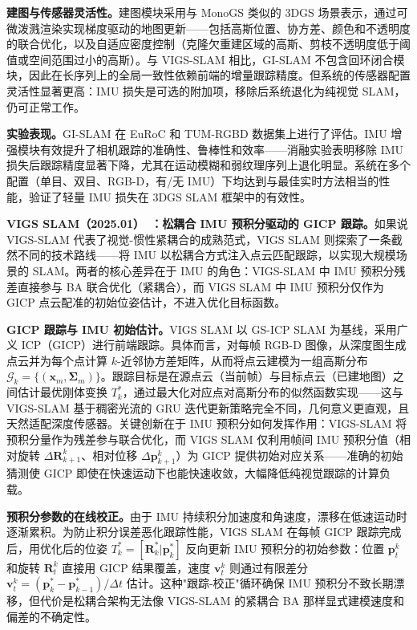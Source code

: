 \textbf{建图与传感器灵活性。}建图模块采用与 MonoGS 类似的 3DGS 场景表示，通过可微泼溅渲染实现梯度驱动的地图更新——包括高斯位置、协方差、颜色和不透明度的联合优化，以及自适应密度控制（克隆欠重建区域的高斯、剪枝不透明度低于阈值或空间范围过小的高斯）。与 VIGS-SLAM 相比，GI-SLAM 不包含回环闭合模块，因此在长序列上的全局一致性依赖前端的增量跟踪精度。但系统的传感器配置灵活性显著更高：IMU 损失是可选的附加项，移除后系统退化为纯视觉 SLAM，仍可正常工作。

\textbf{实验表现。}GI-SLAM 在 EuRoC 和 TUM-RGBD 数据集上进行了评估。IMU 增强模块有效提升了相机跟踪的准确性、鲁棒性和效率——消融实验表明移除 IMU 损失后跟踪精度显著下降，尤其在运动模糊和弱纹理序列上退化明显。系统在多个配置（单目、双目、RGB-D，有/无 IMU）下均达到与最佳实时方法相当的性能，验证了轻量 IMU 损失在 3DGS SLAM 框架中的有效性。

\textbf{VIGS SLAM（2025.01）~\cite{2501_13402}：松耦合 IMU 预积分驱动的 GICP 跟踪。}如果说 VIGS-SLAM 代表了视觉-惯性紧耦合的成熟范式，VIGS SLAM 则探索了一条截然不同的技术路线——将 IMU 以松耦合方式注入点云匹配跟踪，以实现大规模场景的 SLAM。两者的核心差异在于 IMU 的角色：VIGS-SLAM 中 IMU 预积分残差直接参与 BA 联合优化（紧耦合），而 VIGS SLAM 中 IMU 预积分仅作为 GICP 点云配准的初始位姿估计，不进入优化目标函数。

\textbf{GICP 跟踪与 IMU 初始估计。}VIGS SLAM 以 GS-ICP SLAM 为基线，采用广义 ICP（GICP）进行前端跟踪。具体而言，对每帧 RGB-D 图像，从深度图生成点云并为每个点计算 $k$-近邻协方差矩阵，从而将点云建模为一组高斯分布 $\mathcal{G}_k = \{(\mathbf{x}_m, \boldsymbol{\Sigma}_m)\}$。跟踪目标是在源点云（当前帧）与目标点云（已建地图）之间估计最优刚体变换 $T_k^*$，通过最大化对应点对高斯分布的似然函数实现——这与 VIGS-SLAM 基于稠密光流的 GRU 迭代更新策略完全不同，几何意义更直观，且天然适配深度传感器。关键创新在于 IMU 预积分如何发挥作用：VIGS-SLAM 将预积分量作为残差参与联合优化，而 VIGS SLAM 仅利用帧间 IMU 预积分值（相对旋转 $\Delta\mathbf{R}^k_{k+1}$、相对位移 $\Delta\mathbf{p}^k_{k+1}$）为 GICP 提供初始对应关系——准确的初始猜测使 GICP 即使在快速运动下也能快速收敛，大幅降低纯视觉跟踪的计算负载。

\textbf{预积分参数的在线校正。}由于 IMU 持续积分加速度和角速度，漂移在低速运动时逐渐累积。为防止积分误差恶化跟踪性能，VIGS SLAM 在每帧 GICP 跟踪完成后，用优化后的位姿 $T_k^* = [\mathbf{R}_k^*|\mathbf{p}_k^*]$ 反向更新 IMU 预积分的初始参数：位置 $\mathbf{p}_t^k$ 和旋转 $\mathbf{R}_t^k$ 直接用 GICP 结果覆盖，速度 $\mathbf{v}_t^k$ 则通过有限差分 $\mathbf{v}_t^k = (\mathbf{p}_k^* - \mathbf{p}_{k-1}^*)/\Delta t$ 估计。这种"跟踪-校正"循环确保 IMU 预积分不致长期漂移，但代价是松耦合架构无法像 VIGS-SLAM 的紧耦合 BA 那样显式建模速度和偏差的不确定性。

